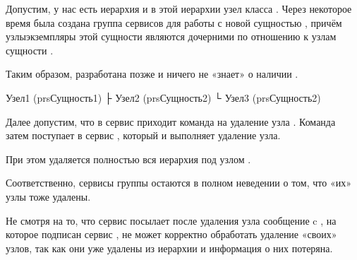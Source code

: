 \documentclass[a4paper,10pt,russian]{sphinxmanual}
\begin{document}
\sphinxAtStartPar
Допустим, у нас есть иерархия и в этой иерархии \sphinxhyphen{} узел класса
. Через некоторое время была создана группа сервисов
для работы с новой сущностью , причём узлы\sphinxhyphen{}экземпляры этой
сущности являются дочерними по отношению к узлам сущности .

\sphinxAtStartPar
Таким образом,  разработана позже и  ничего
не «знает» о наличии .

\begin{sphinxVerbatim}[commandchars=\\\{\}]
Узел\PYGZus{}1 (prsСущность\PYGZus{}1)
 ├ Узел\PYGZus{}2 (prsСущность\PYGZus{}2)
 └ Узел\PYGZus{}3 (prsСущность\PYGZus{}2)
\end{sphinxVerbatim}

\sphinxAtStartPar
Далее допустим, что в сервис  приходит команда на
удаление узла . Команда затем поступает в сервис
, который и выполняет удаление узла.

\sphinxAtStartPar
При этом удаляется полностью вся иерархия под узлом .

\sphinxAtStartPar
Соответственно, сервисы группы  остаются в полном неведении
о том, что «их» узлы тоже удалены.

\sphinxAtStartPar
Не смотря на то, что сервис  посылает после удаления
узла сообщение c , на которое подписан сервис
,  не может корректно обработать удаление
«своих» узлов, так как они уже удалены из иерархии и информация о них
потеряна.
\end{document}
